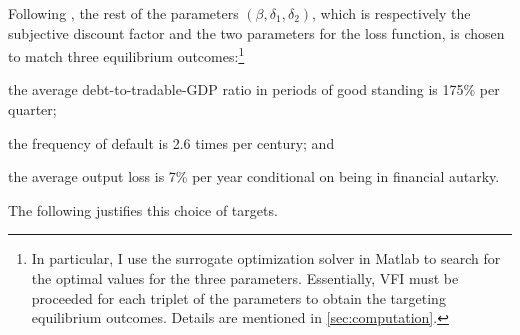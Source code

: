 Following \citet{Na-18}, the rest of the parameters $\left( \beta, \delta_1, \delta_2 \right)$, which is respectively the subjective discount factor and the two parameters for the loss function, is chosen to match three equilibrium outcomes:\footnote{
    In particular, I use the surrogate optimization solver in Matlab to search for the optimal values for the three parameters. Essentially, VFI must be proceeded for each triplet of the parameters to obtain the targeting equilibrium outcomes. Details are mentioned in \autoref{sec:computation}.
}
\begin{enumerate*}[label = (\roman*)]
    \item the average debt-to-tradable-GDP ratio in periods of good standing is 175\% per quarter;
    \item the frequency of default is 2.6 times per century; and
    \item the average output loss is 7\% per year conditional on being in financial autarky.
\end{enumerate*}
The following justifies this choice of targets.
